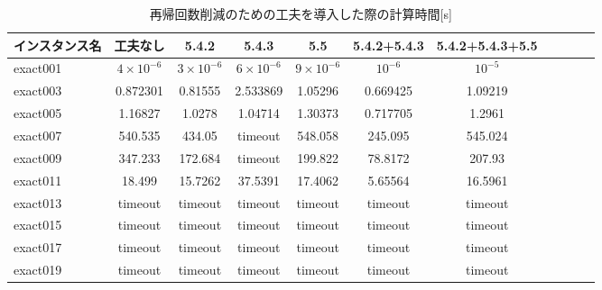\documentclass[10.5,a4paper,titlepage, dvipdfmx]{bxjsarticle}
\begin{document}
\begin{table}[H]
    \caption{再帰回数削減のための工夫を導入した際の計算時間[s]}
    \label{table:data_type}
    \centering
    \begin{tabular}{l|cccccccccr}
        \hline
        インスタンス名  & 工夫なし & 5.4.2  & 5.4.3 & 5.5 & 5.4.2+5.4.3  & 5.4.2+5.4.3+5.5\\
        \hline
        exact001 & $4 \times 10^{-6}$ & $3 \times 10^{-6}$  & $6 \times 10^{-6}$ & $9 \times 10^{-6}$ & $10^{-6}$ & $10^{-5}$\\
        exact003 & 0.872301 & 0.81555 & 2.533869 & 1.05296 & 0.669425 & 1.09219\\
        exact005 & 1.16827 & 1.0278 & 1.04714 & 1.30373 & 0.717705 & 1.2961\\
        exact007 & 540.535 & 434.05 & timeout & 548.058 & 245.095 & 545.024\\
        exact009 & 347.233 & 172.684 & timeout & 199.822 & 78.8172 & 207.93\\
        exact011 & 18.499 & 15.7262 & 37.5391 & 17.4062 & 5.65564& 16.5961\\
        exact013 & timeout & timeout & timeout & timeout & timeout & timeout\\
        exact015 & timeout & timeout & timeout & timeout & timeout & timeout\\
        exact017 & timeout & timeout & timeout & timeout & timeout & timeout\\
        exact019 & timeout & timeout & timeout & timeout & timeout & timeout\\
        \hline
    \end{tabular}
\end{table}
\end{document}
